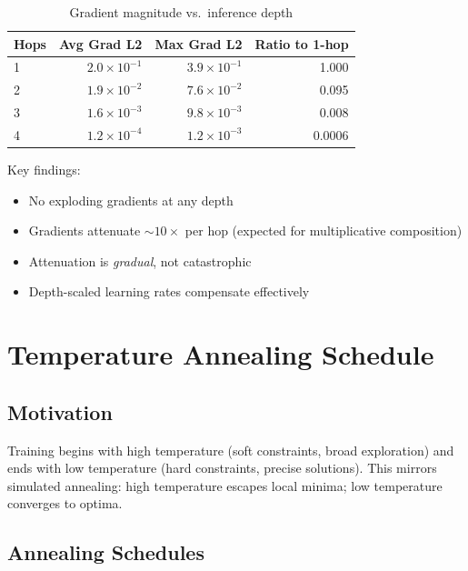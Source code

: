 \documentclass[11pt,a4paper]{article}
\begin{document}
\begin{table}[ht]
\centering
\caption{Gradient magnitude vs.\ inference depth}
\label{tab:gradient_depth_chirho}
\begin{tabular}{lrrr}
\toprule
\textbf{Hops} & \textbf{Avg Grad L2} & \textbf{Max Grad L2} & \textbf{Ratio to 1-hop} \\
\midrule
1 & $2.0 \times 10^{-1}$ & $3.9 \times 10^{-1}$ & 1.000 \\
2 & $1.9 \times 10^{-2}$ & $7.6 \times 10^{-2}$ & 0.095 \\
3 & $1.6 \times 10^{-3}$ & $9.8 \times 10^{-3}$ & 0.008 \\
4 & $1.2 \times 10^{-4}$ & $1.2 \times 10^{-3}$ & 0.0006 \\
\bottomrule
\end{tabular}
\end{table}

Key findings:
\begin{itemize}
  \item No exploding gradients at any depth
  \item Gradients attenuate $\sim 10\times$ per hop (expected for multiplicative composition)
  \item Attenuation is \emph{gradual}, not catastrophic
  \item Depth-scaled learning rates compensate effectively
\end{itemize}

\section{Temperature Annealing Schedule}
\label{sec:annealing_chirho}

\subsection{Motivation}
\label{subsec:annealing_motivation_chirho}

Training begins with high temperature (soft constraints, broad exploration) and ends with low temperature (hard constraints, precise solutions).
This mirrors simulated annealing: high temperature escapes local minima; low temperature converges to optima.

\subsection{Annealing Schedules}
\label{subsec:schedules_chirho}
\end{document}
